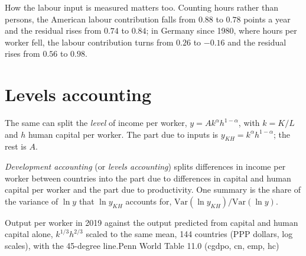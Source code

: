 How the labour input is measured matters too. Counting hours rather than
persons, the American labour contribution falls from $0.88$ to $0.78$ points a
year and the residual rises from $0.74$ to $0.84$; in Germany since 1980,
where hours per worker fell, the labour contribution turns from $0.26$ to
$-0.16$ and the residual rises from $0.56$ to $0.98$. %

\section{Levels accounting}\label{sec:b1:growth-accounting:levels}

The same  can split the \emph{level} of income per
worker, $y = A k^{\alpha} h^{1 - \alpha}$, with $k = K/L$ and $h$ human capital per worker. The part
due to inputs is $y_{KH} = k^{\alpha}h^{1 - \alpha}$; the rest is $A$.

\begin{definition}\label{def:b1:growth-accounting:development-accounting}
\emph{Development accounting} (or \emph{levels accounting}) splits
differences in income per worker between countries into the part due to
differences in capital and human capital per worker and the part due to
productivity. One summary is the share of the variance of $\ln y$ that $\ln y_{KH}$
accounts for, $\mathrm{Var}(\ln y_{KH})/\mathrm{Var}(\ln y)$.
\end{definition}

\begin{omchart}{Output per worker in 2019 against the output predicted from
capital and human capital alone, $k^{1/3}h^{2/3}$ scaled to the same mean, 144
countries (PPP dollars, log scales), with the 45-degree line.}{Penn World
Table 11.0 (cgdpo, cn, emp, hc)}
\end{omchart}

